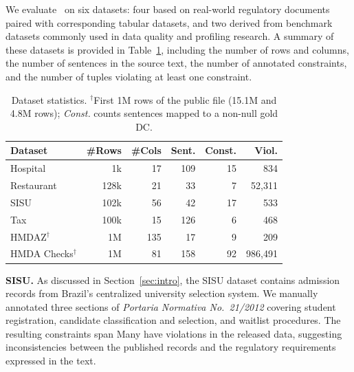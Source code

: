 We evaluate \system\ on six datasets: four based on real-world regulatory documents paired with corresponding tabular datasets, and two derived from benchmark datasets commonly used in data quality and profiling research. A summary of these datasets is provided in Table~\ref{tab:datasets}, including the number of rows and columns, the number of sentences in the source text, the number of annotated constraints, and the number of tuples violating at least one constraint. 



\begin{table}[ht]
  \centering
  \caption{Dataset statistics. $^{\dagger}$First 1M rows of the public file (15.1M and 4.8M rows); \emph{Const.} counts sentences mapped to a non-null gold DC.}
  \label{tab:datasets}
\small
  \begin{tabular}{lrrrrr}
    \toprule
    \textbf{Dataset} & \textbf{\#Rows} & \textbf{\#Cols} & \textbf{Sent.} & \textbf{Const.} & \textbf{Viol.} \\
    \midrule
    Hospital & 1k & 17 & 109 & 15 & 834 \\
    Restaurant & 128k & 21 & 33 & 7 & 52,311 \\
    SISU & 102k & 56 & 42 & 17 & 533 \\
    Tax & 100k & 15 & 126 & 6 & 468 \\
    HMDAZ$^{\dagger}$ & 1M & 135 & 17 & 9 & 209 \\
    HMDA Checks$^{\dagger}$ & 1M & 81 & 158 & 92 & 986,491 \\
    \bottomrule
  \end{tabular}%
\end{table}

\smallskip\noindent\textbf{SISU.}
As discussed in Section~\ref{sec:intro}, the SISU dataset contains admission
records from Brazil's centralized university selection system. We manually
annotated three sections of \textit{Portaria Normativa No.~21/2012} covering student
registration, candidate classification and selection, and waitlist procedures.
The resulting constraints span  Many have violations in
the released data, suggesting inconsistencies between the published records and
the regulatory requirements expressed in the text.


